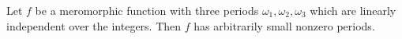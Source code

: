 Let $f$ be a meromorphic function with three periods $\omega_1, \omega_2, \omega_3$ which are linearly independent over the integers. Then $f$ has arbitrarily small nonzero periods.
